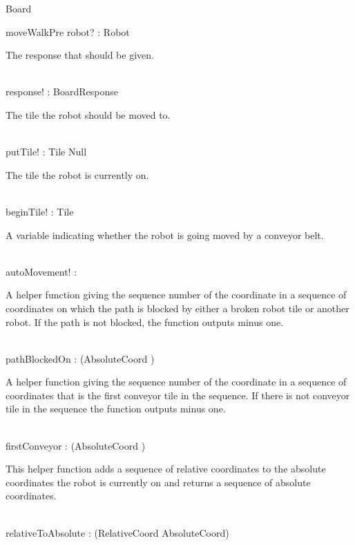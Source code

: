 \documentclass[12pt]{article}
\begin{document}
\begin{class}{Board}
\begin{nobottomschema}{moveWalkPre}
robot? : Robot \\
\begin{zpar}
The response that should be given.
\end{zpar} \\
response! : BoardResponse \\
\begin{zpar}
The tile the robot should be moved to.
\end{zpar} \\
putTile! : Tile \cup Null \\
\begin{zpar}
The tile the robot is currently on.
\end{zpar} \\
beginTile! : Tile \\
\begin{zpar}
A variable indicating whether the robot is going moved by a conveyor belt.
\end{zpar} \\
autoMovement! : \bool \\
\end{nobottomschema}
\znewpage
\begin{nobothschema}
\begin{zpar}
A helper function giving the sequence number of the coordinate in a sequence of coordinates on which the path is blocked by either a broken robot tile or another robot. If the path is not blocked, the function outputs minus one.
\end{zpar} \\
pathBlockedOn : \power (\seq AbsoluteCoord \fun \nat) \\
\begin{zpar}
A helper function giving the sequence number of the coordinate in a sequence of coordinates that is the first conveyor tile in the sequence. If there is not conveyor tile in the sequence the function outputs minus one.
\end{zpar} \\
firstConveyor : \power (\seq AbsoluteCoord \fun \nat) \\
\begin{zpar}
This helper function adds a sequence of relative coordinates to the absolute coordinates the robot is currently on and returns a sequence of absolute coordinates.
\end{zpar} \\
relativeToAbsolute : \power (\seq RelativeCoord \pfun \seq AbsoluteCoord) \\
\begin{zpar}

\end{zpar}
\end{nobothschema}
\end{class}
\end{document}
